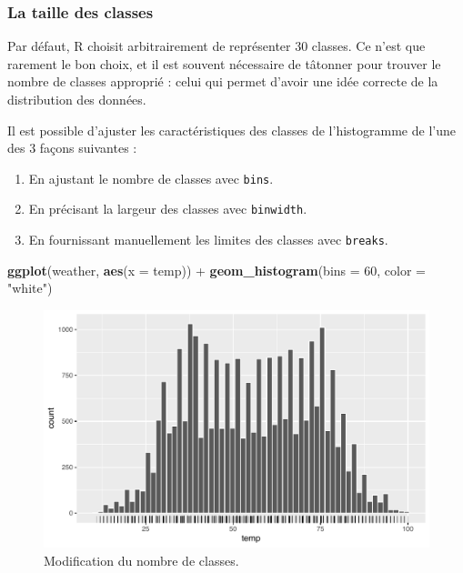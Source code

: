 \documentclass[
  a4paper,
]{article}
\newenvironment{Shaded}{\begin{snugshade}}{\end{snugshade}}
\newcommand{\DataTypeTok}[1]{\textcolor[rgb]{0.00,0.34,0.68}{#1}}
\newcommand{\DecValTok}[1]{\textcolor[rgb]{0.69,0.50,0.00}{#1}}
\newcommand{\KeywordTok}[1]{\textcolor[rgb]{0.12,0.11,0.11}{\textbf{#1}}}
\newcommand{\NormalTok}[1]{\textcolor[rgb]{0.12,0.11,0.11}{#1}}
\newcommand{\OperatorTok}[1]{\textcolor[rgb]{0.12,0.11,0.11}{#1}}
\newcommand{\StringTok}[1]{\textcolor[rgb]{0.75,0.01,0.01}{#1}}
\providecommand{\tightlist}{%
  \setlength{\itemsep}{0pt}\setlength{\parskip}{0pt}}
\begin{document}
\hypertarget{la-taille-des-classes}{%
\subsubsection{La taille des classes}\label{la-taille-des-classes}}

Par défaut, R choisit arbitrairement de représenter 30 classes. Ce n'est que rarement le bon choix, et il est souvent nécessaire de tâtonner pour trouver le nombre de classes approprié : celui qui permet d'avoir une idée correcte de la distribution des données.

Il est possible d'ajuster les caractéristiques des classes de l'histogramme de l'une des 3 façons suivantes :

\begin{enumerate}
\def\labelenumi{\arabic{enumi}.}
\tightlist
\item
  En ajustant le nombre de classes avec \texttt{bins}.
\item
  En précisant la largeur des classes avec \texttt{binwidth}.
\item
  En fournissant manuellement les limites des classes avec \texttt{breaks}.
\end{enumerate}

\begin{Shaded}
\begin{Highlighting}[]
\KeywordTok{ggplot}\NormalTok{(weather, }\KeywordTok{aes}\NormalTok{(}\DataTypeTok{x =}\NormalTok{ temp)) }\OperatorTok{+}
\StringTok{  }\KeywordTok{geom_histogram}\NormalTok{(}\DataTypeTok{bins =} \DecValTok{60}\NormalTok{, }\DataTypeTok{color =} \StringTok{"white"}\NormalTok{)}
\end{Highlighting}
\end{Shaded}

\begin{figure}[htpb]

{\centering \includegraphics[width=0.9\linewidth]{figure/unnamed-chunk-49-1} 

}

\caption{Modification du nombre de classes.}\label{fig:unnamed-chunk-49}
\end{figure}
\end{document}

